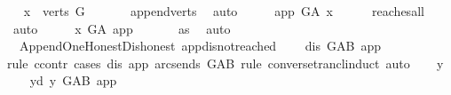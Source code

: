 \begin{isabellebody}
\ \isamarkupfalse%
\ {\isachardoublequoteopen}x\ {\isasymin}\ verts\ G{\isachardoublequoteclose}\ \isanewline
\ \ \ \ \isamarkupfalse%
\ append{\isacharunderscore}{\kern0pt}verts\ \isamarkupfalse%
\ auto\isanewline
\ \ \isamarkupfalse%
\ \isamarkupfalse%
\ {\isachardoublequoteopen}app\ {\isasymrightarrow}\isactrlsup {\isacharplus}{\kern0pt}\isactrlbsub G{\isacharunderscore}{\kern0pt}A\isactrlesub \ x{\isachardoublequoteclose}\isanewline
\ \ \ \ \isamarkupfalse%
\ reaches{\isacharunderscore}{\kern0pt}all\ \isamarkupfalse%
\ auto\isanewline
\ \ \isamarkupfalse%
\ \isamarkupfalse%
\ {\isachardoublequoteopen}x\ {\isasymrightarrow}\isactrlsup {\isacharplus}{\kern0pt}\isactrlbsub G{\isacharunderscore}{\kern0pt}A\isactrlesub \ app{\isachardoublequoteclose}\ \isanewline
\ \ \ \ \isamarkupfalse%
\ as\ \isamarkupfalse%
\ auto\isanewline
{}\isamarkupfalse%
%
\endisatagproof
{\isafoldproof}%
%
\isadelimproof
%
\endisadelimproof
%
\isadelimdocument
%
\endisadelimdocument
%
\isatagdocument
%
\isamarkuptrue%
%
\endisatagdocument
{\isafolddocument}%
%
\isadelimdocument
%
\endisadelimdocument
{}\isamarkupfalse%
\ {\isacharparenleft}{\kern0pt}\ Append{\isacharunderscore}{\kern0pt}One{\isacharunderscore}{\kern0pt}Honest{\isacharunderscore}{\kern0pt}Dishonest{\isacharparenright}{\kern0pt}\ app{\isacharunderscore}{\kern0pt}dis{\isacharunderscore}{\kern0pt}not{\isacharunderscore}{\kern0pt}reached{\isacharcolon}{\kern0pt}\isanewline
\ \ \ {\isachardoublequoteopen}{\isasymnot}\ dis\ {\isasymrightarrow}\isactrlsup {\isacharplus}{\kern0pt}\isactrlbsub G{\isacharunderscore}{\kern0pt}AB\isactrlesub \ app{\isachardoublequoteclose}\ \isanewline
%
\isadelimproof
%
\endisadelimproof
%
\isatagproof
{}\isamarkupfalse%
{\isacharparenleft}{\kern0pt}rule\ ccontr{\isacharcomma}{\kern0pt}\ cases\ dis\ app\ {\isachardoublequoteopen}{\isacharparenleft}{\kern0pt}arcs{\isacharunderscore}{\kern0pt}ends\ G{\isacharunderscore}{\kern0pt}AB{\isacharparenright}{\kern0pt}{\isachardoublequoteclose}\ rule{\isacharcolon}{\kern0pt}\ converse{\isacharunderscore}{\kern0pt}trancl{\isacharunderscore}{\kern0pt}induct{\isacharcomma}{\kern0pt}\ auto{\isacharparenright}{\kern0pt}\isanewline
\ \ \isamarkupfalse%
\ y\isanewline
\ \ \isamarkupfalse%
\ y{\isacharunderscore}{\kern0pt}d{\isacharcolon}{\kern0pt}\ {\isachardoublequoteopen}y\ {\isasymrightarrow}\isactrlbsub G{\isacharunderscore}{\kern0pt}AB\isactrlesub \ app{\isachardoublequoteclose}\isanewline

\end{isabellebody}
